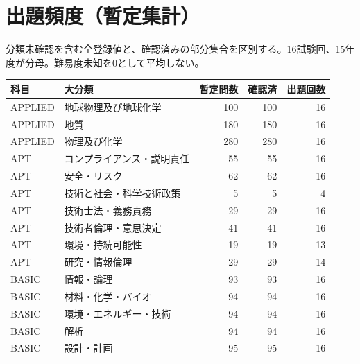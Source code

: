 \chapter{出題頻度（暫定集計）}
分類未確認を含む全登録値と、確認済みの部分集合を区別する。16試験回、15年度が分母。難易度未知を0として平均しない。
\begin{longtable}{p{.16\linewidth}p{.42\linewidth}rrr}
科目 & 大分類 & 暫定問数 & 確認済 & 出題回数\\\hline
APPLIED & 地球物理及び地球化学 & 100 & 100 & 16\\
APPLIED & 地質 & 180 & 180 & 16\\
APPLIED & 物理及び化学 & 280 & 280 & 16\\
APT & コンプライアンス・説明責任 & 55 & 55 & 16\\
APT & 安全・リスク & 62 & 62 & 16\\
APT & 技術と社会・科学技術政策 & 5 & 5 & 4\\
APT & 技術士法・義務責務 & 29 & 29 & 16\\
APT & 技術者倫理・意思決定 & 41 & 41 & 16\\
APT & 環境・持続可能性 & 19 & 19 & 13\\
APT & 研究・情報倫理 & 29 & 29 & 14\\
BASIC & 情報・論理 & 93 & 93 & 16\\
BASIC & 材料・化学・バイオ & 94 & 94 & 16\\
BASIC & 環境・エネルギー・技術 & 94 & 94 & 16\\
BASIC & 解析 & 94 & 94 & 16\\
BASIC & 設計・計画 & 95 & 95 & 16\\
\end{longtable}
